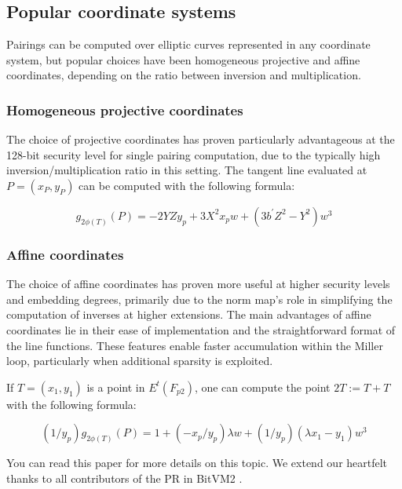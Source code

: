 \subsection{Popular coordinate systems}

Pairings can be computed over elliptic curves represented in any coordinate system, but popular choices have been homogeneous projective and affine coordinates, depending on the ratio between inversion and multiplication.

\subsubsection{Homogeneous projective coordinates} 
The choice of projective coordinates has proven particularly advantageous at the 128-bit security level for single pairing
computation, due to the typically high inversion/multiplication ratio in this setting. The tangent line evaluated at
$ P = (x_P , y_P)$ can be computed with the following formula:

\begin{equation}
    g_{2\phi(T)}(P) = -2YZy_p + 3X^2x_pw + (3b^{'}Z^2 - Y^2)w^3
\end{equation}

\subsubsection{Affine coordinates} 

The choice of affine coordinates has proven more useful at higher security levels and embedding degrees, primarily due to 
the norm map's role in simplifying the computation of inverses at higher extensions. The main advantages of affine coordinates 
lie in their ease of implementation and the straightforward format of the line functions. These features enable faster 
accumulation within the Miller loop, particularly when additional sparsity is exploited.

If $ T = (x_1, y_1)$ is a point in $E^t(F_{p2})$, one can compute the point $ 2T := T + T $ with the following formula:

\begin{equation}
    (1 / y_p)g_{2\phi(T)}(P) = 1 + (-x_p/y_p)\lambda w + (1 / y_p)(\lambda x_1 - y_1)w^3
\end{equation}

You can read this paper \cite{website:The-realm-of-the-pairings} for more details on this topic. 
We extend our heartfelt thanks to all contributors of the PR \cite{website:PR} in BitVM2 \cite{website:BitVM2}.
